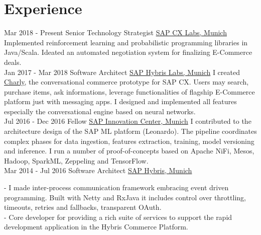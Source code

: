 \documentclass[letterpaper]{twentysecondcv} %
\begin{document}
\makeprofile %
 

\section{Experience}

\begin{twenty} %
\twentyitem
    	{Mar 2018 -}
		{Present}
        {Senior Technology Strategist}
        {\href{http://cx.sap.com/}{SAP CX Labs, Munich}}
        {}
        {
    		Implemented reinforcement learning and probabilistic programming libraries in Java/Scala. Ideated an automated negotiation system for finalizing E-Commerce deals. 
	    }
        \\
\twentyitem
    	{Jan 2017 -}
		{Mar 2018}
        {Software Architect}
        {\href{http://cx.sap.com/}{SAP Hybris Labs, Munich}}
        {}
        {
        I created \href{http://charly.hybris.com/}{Charly}, the conversational commerce prototype for SAP CX. Users may search, purchase items, ask informations, leverage functionalities of flagship E-Commerce platform just with messaging apps.
      I designed and implemented all features especially the conversational engine based on neural networks.
      }
        \\
	\twentyitem
    	{Jul 2016 -}
		{Dec 2016 }
        {Fellow}
        {\href{https://icn.sap.com/}{SAP Innovation Center, Munich}}
        {}
        {
        {
        I contributed to the architecture design of the SAP ML platform (Leonardo). The pipeline coordinates complex phases for data ingestion, features extraction, training,
      model versioning and inference. I run a number of proof-of-concepts based on Apache NiFi, Mesos, Hadoop, SparkML, Zeppeling and TensorFlow.  
        }
        }
    \\   
    \twentyitem
   		{Mar 2014 -}
		{Jul 2016}
        {Software Architect}
        {\href{http://www.hybris.com}{SAP Hybris, Munich}}
        {}
        {
        {
        - I made inter-process communication framework embracing event driven programming. Built with Netty and RxJava it includes control over throttling, timeouts, retries and fallbacks, transparent OAuth.
        \\
        -  Core developer for providing a rich suite of services to support the rapid development application in the Hybris Commerce Platform. 

}}
\end{twenty}
\end{document}
